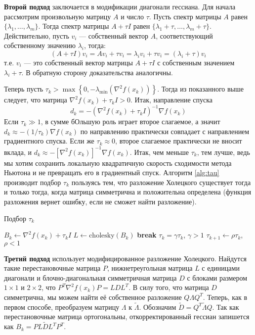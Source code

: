 \documentclass[a4paper, 12pt]{article}
\begin{document}
\textbf{Второй подход} заключается в модификации диагонали гессиана. Для начала рассмотрим произвольную матрицу $A$ и число $\tau$. Пусть спектр матрицы $A$ равен $\{\lambda_1, \dots, \lambda_m\}$. Тогда спектр матрицы $A + \tau I$ равен $\{\lambda_1 + \tau, \dots, \lambda_m + \tau\}$. Действительно, пусть $v_i$ --- собственный вектор $A$, соответствующий собственному значению $\lambda_i$, тогда:
$$(A + \tau I)v_i = Av_i + \tau v_i = \lambda_i v_i + \tau v_i = (\lambda_i + \tau) v_i$$
т.е. $v_i$ --- это собственный вектор матрицы $A + \tau I$ с собственным значением $\lambda_i + \tau$. В обратную сторону доказательства аналогичны. 

Теперь пусть $\tau_k > \max\left\{0, -\lambda_\mathrm{min}(\nabla^2 f(x_k))\right\}$. Тогда из показанного выше следует, что матрица $\nabla^2 f(x_k) + \tau_kI > 0$. Итак, направление спуска
$$d_k = -\left(\nabla^2 f(x_k) + \tau_k I\right)^{-1} \nabla f(x_k)$$
Если $\tau_k \gg 1$, в сумме бОльшую роль играет второе слагаемое, а значит $d_k \approx -(1/\tau_k) \nabla f(x_k)$ по направлению практически совпадает с направлением градиентного спуска. Если же $\tau_k \approx 0$, второе слагаемое практически не вносит вклада, и $d_k \approx -[\nabla^2 f(x_k)]^{-1}\nabla f(x_k)$. Итак, чем меньше $\tau_k$, тем лучше, ведь мы хотим сохранить локальную квадратичную скорость сходимости метода Ньютона и не превращать его в градиентный спуск. Алгоритм \ref{alg:tau} производит подбор $\tau_k$ пользуясь тем, что разложение Холецкого существует тогда и только тогда, когда матрица симметрична и положительна определена (функция разложения вернет ошибку, если не сможет найти разложение).

\begin{algorithm}[t]
\caption{Подбор $\tau_k$}\label{alg:tau}
\begin{algorithmic}[1]
\Loop
    \State $B_k \gets \nabla^2f(x_k) + \tau_k I$
    \State $L \gets \mathrm{cholesky}(B_k)$ 
     \Then
        \State\textbf{break}
    \EndIf
    \State $\tau_k = \gamma \tau_k$, $\gamma > 1$
\EndLoop
\State $\tau_{k+1} \gets \rho \tau_k$, $\rho < 1$
\end{algorithmic}
\end{algorithm}

\textbf{Третий подход} использует модифицированное разложение Холецкого. Найдутся такие перестановочные матрица $P$, нижнетреугольная матрица $L$ с единицами диагонали и блочно-диагональная симметричная матрица $D$ с блоками размером $1\times1$ и $2\times2$, что $P^T \nabla^2 f(x_k) P = LDL^T$. В силу того, что матрица $D$ симметрична, мы можем найти её собственное разложение $Q\Lambda Q^T$. Теперь, как в первом способе, преобразуем матрицу $\Lambda$ к $\tilde{\Lambda}$. Обозначим $\tilde{D} = Q^T\tilde{\Lambda}Q$. Так как перестановочные матрица ортогональны, откорректированный гессиан запишется как $B_k = PL\tilde{D}L^TP^T$.
\end{document}
